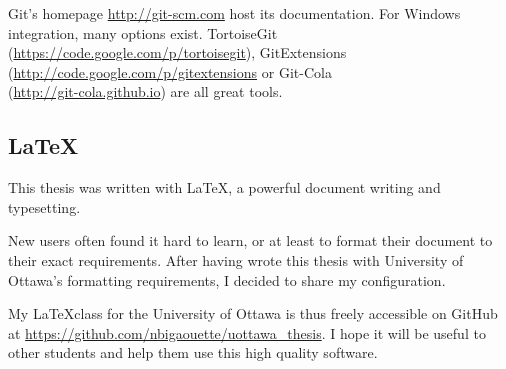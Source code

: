 Git's homepage \url{http://git-scm.com} host its documentation. For Windows
integration, many options exist.
TortoiseGit (\url{https://code.google.com/p/tortoisegit}),
GitExtensions (\url{http://code.google.com/p/gitextensions}
or Git-Cola \\
(\url{http://git-cola.github.io}) are all great tools.


\subsection*{\LaTeX}

This thesis was written with \LaTeX, a powerful document writing and typesetting.

New users often found it hard to learn, or at least to format their document
to their exact requirements. After having wrote this thesis with University of
Ottawa's formatting requirements, I decided to share my configuration.

My \LaTeX class for the University of Ottawa is thus freely accessible on
GitHub at \url{https://github.com/nbigaouette/uottawa_thesis}. I hope it will
be useful to other students and help them use this high quality software.



